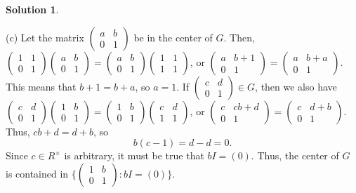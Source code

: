 \documentclass[10pt]{article}
\theoremstyle{Theorem}
\theoremstyle{definition}
\newtheorem{sol}{Solution}
\theoremstyle{remark}
\theoremstyle{custom}
\begin{document}
\begin{sol}
\begin{description}
\item{(c)} Let the matrix $(\begin{smallmatrix}a&b\\0&1\end{smallmatrix})$ be in the center of $G$. Then, $(\begin{smallmatrix}1&1\\0&1\end{smallmatrix})(\begin{smallmatrix}a&b\\0&1\end{smallmatrix})=(\begin{smallmatrix}a&b\\0&1\end{smallmatrix})(\begin{smallmatrix}1&1\\1&1\end{smallmatrix})$, or $(\begin{smallmatrix}a&b+1\\0&1\end{smallmatrix})=(\begin{smallmatrix}a&b+a\\0&1\end{smallmatrix})$. This means that $b+1=b+a$, so $a=1$. If $(\begin{smallmatrix}c&d\\0&1\end{smallmatrix})\in G$, then we also have $(\begin{smallmatrix}c&d\\0&1\end{smallmatrix})(\begin{smallmatrix}1&b\\0&1\end{smallmatrix})=(\begin{smallmatrix}1&b\\0&1\end{smallmatrix})(\begin{smallmatrix}c&d\\1&1\end{smallmatrix})$, or $(\begin{smallmatrix}c&cb+d\\0&1\end{smallmatrix})=(\begin{smallmatrix}c&d+b\\0&1\end{smallmatrix})$. Thus, $cb+d=d+b$, so 
\[b(c-1)=d-d=0.\]
Since $c\in R^\times$ is arbitrary, it must be true that $bI=(0)$. Thus, the center of $G$ is contained in $\{(\begin{smallmatrix}1&b\\0&1\end{smallmatrix}) : bI = (0)\}$. \\

\end{description}
\end{sol}
\end{document}
